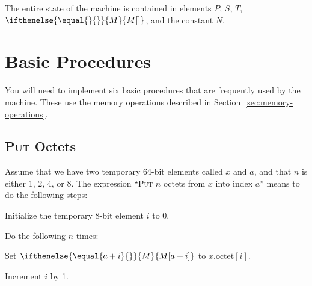 \documentclass[a4paper,12pt]{article}
\newcommand{\MEM}[1]{\ifthenelse{\equal{#1}{}}{M}{M[#1]}}
\newcommand{\PC}{P}
\newcommand{\SP}{S}
\newcommand{\TERM}{T}
\newcommand{\octno}[2]{#1.\mathrm{octet}[#2]}
\newcommand{\proc}[1]{\textsc{#1}}
\theoremstyle{definition}
\begin{document}
The entire state of the machine is contained in elements $\PC$, $\SP$, $\TERM$, $\MEM{}$, and the constant $N$.

\section{Basic Procedures}

You will need to implement six basic procedures that are frequently used by the machine.
These use the memory operations described in Section~\ref{sec:memory-operations}.

\subsection{\proc{Put} Octets}

Assume that we have two temporary 64-bit elements called $x$ and $a$, and that $n$ is either 1, 2, 4, or 8.
The expression ``\proc{Put} $n$ octets from $x$ into index $a$'' means to do the following steps:
\begin{stepnumbers}
\item Initialize the temporary 8-bit element $i$ to 0.
\item Do the following $n$ times:
  \begin{stepletters}
  \item Set $\MEM{a+i}$ to $\octno{x}{i}$.
  \item Increment $i$ by 1.
  \end{stepletters}
\end{stepnumbers}
\end{document}
